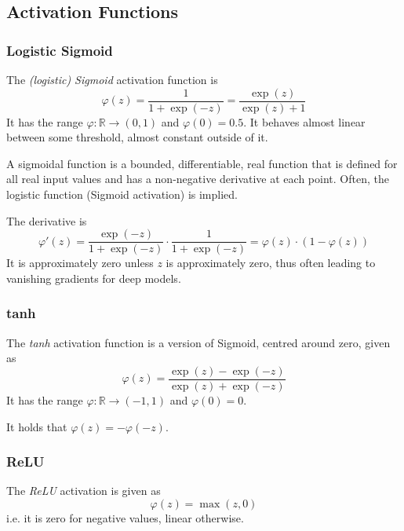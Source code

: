\subsection{Activation Functions}
\subsubsection{Logistic Sigmoid}
The \emph{(logistic) Sigmoid} activation function is
\begin{equation*}
    \varphi(z) = \frac{1}{1 + \exp{(-z)}}
    = \frac{\exp{(z)}}{\exp{(z)} + 1}
\end{equation*}
It has the range $\varphi : \mathbb{R} \to (0, 1)$
and $\varphi(0) = 0.5$.
It behaves almost linear between some threshold,
almost constant outside of it.

A sigmoidal function is a bounded, differentiable, real function
that is defined for all real input values and has a non-negative
derivative at each point.
Often, the logistic function (Sigmoid activation) is implied.

The derivative is
\begin{equation*}
    \varphi'(z)
    = \frac{\exp{(-z)}}{1 + \exp{(-z)}} \cdot \frac{1}{1 + \exp{(-z)}}
    = \varphi(z) \cdot (1 - \varphi(z))
\end{equation*}
It is approximately zero unless $z$ is approximately zero,
thus often leading to vanishing gradients for deep models.

\subsubsection{tanh}
The \emph{tanh} activation function is a version of Sigmoid, 
centred around zero, given as
\begin{equation*}
    \varphi(z)
    = \frac{\exp{(z)} - \exp{(-z)}}{\exp{(z)} + \exp{(-z)}}
\end{equation*}
It has the range $\varphi : \mathbb{R} \to (-1, 1)$
and $\varphi(0) = 0$.

It holds that $\varphi(z) = - \varphi(-z)$.

\subsubsection{ReLU}
The \emph{ReLU} activation is given as
\begin{equation*}
    \varphi(z) = \max(z, 0)
\end{equation*}
i.e. it is zero for negative values, linear otherwise.


